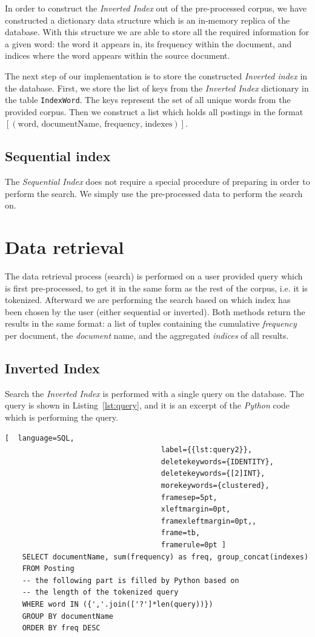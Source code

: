 \documentclass{article}
\begin{document}
	In order to construct the \textit{Inverted Index} out of the pre-processed corpus, we have constructed a dictionary data structure which is an in-memory replica of the database. With this structure we are able to store all the required information for a given word: the word it appears in, its frequency within the document, and indices where the word appears within the source document.
	
	The next step of our implementation is to store the constructed \textit{Inverted index} in the database. First, we store the list of keys from the \textit{Inverted Index} dictionary in the table \texttt{IndexWord}. The keys represent the set of all unique words from the provided corpus. Then we construct a list which holds all postings in the format \newline \texttt{$[(\mbox{word, documentName, frequency, indexes})]$}.
	
	\subsection{Sequential index}
	
	The \textit{Sequential Index} does not require a special procedure of preparing in order to perform the search. We simply use the pre-processed data to perform the search on.
	
	\section{Data retrieval}
	The data retrieval process (search) is performed on a user provided query which is first pre-processed, to get it in the same form as the rest of the corpus, i.e. it is tokenized. Afterward we are performing the search based on which index has been chosen by the user (either sequential or inverted). Both methods return the results in the same format: a list of tuples containing the cumulative \textit{frequency} per document, the \textit{document} name, and the aggregated \textit{indices} of all results.
	
	\subsection{Inverted Index}
	Search the \textit{Inverted Index} is performed with a single query on the database. The query is shown in Listing~\ref{lst:query}, and it is an excerpt of the \textit{Python} code which is performing the query.
	
	\begin{lstlisting}[  language=SQL,
									label={{lst:query2}},
									deletekeywords={IDENTITY},
									deletekeywords={[2]INT},
									morekeywords={clustered},
									framesep=5pt,
									xleftmargin=0pt,
									framexleftmargin=0pt,,
									frame=tb,
									framerule=0pt ]
	SELECT documentName, sum(frequency) as freq, group_concat(indexes)
	FROM Posting
	-- the following part is filled by Python based on
	-- the length of the tokenized query
	WHERE word IN ({','.join(['?']*len(query))})
	GROUP BY documentName
	ORDER BY freq DESC
	\end{lstlisting}
	
\end{document}
